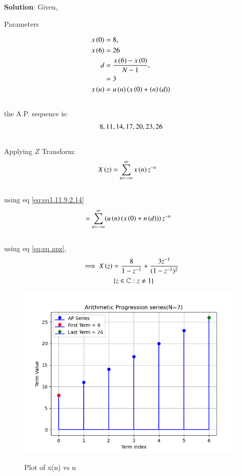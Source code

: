 \documentclass[journal,12pt,twocolumn]{IEEEtran}
\begin{document}
\noindent \textbf{Solution}:
\noindent
Given,
\begin{table}[h]
    \centering
    
    \caption{Parameters}
    \label{tab: 11.9.2.14.1}
\end{table}
\begin{align}
    x\brak{0}&=8,\\  %
    x\brak{6}&=26  \\  %
	d&=\frac{x\brak{6} - x\brak{0}}{N-1},\\
    &=3\\
	x\brak{n}&=u\brak{n}\brak{x\brak{0}+\brak{n}\brak{d}} \label{eq:eq1.11.9.2.14}
\end{align}\\	
the A.P. sequence is:\\
\begin{align}
\notag 8,11,14,17,20,23,26
\end{align}\\
Applying $Z$ Transform:     
\begin{align}
    X\left(z\right)&=\sum_{n=-\infty}^{\infty} x \left(n\right)z^{-n} 
\end{align}\\
using eq \eqref{eq:eq1.11.9.2.14}
\begin{align}
	&=\sum_{n=-\infty}^{\infty}(u\left(n\right)\left(x\left(0\right)+n\left(d\right))\right)z^{-n}
 \end{align}\\
using eq \eqref{eq:eq apz},
\begin{align}
    \implies X\left(z\right)&=\frac{8}{1-z^{-1}} + \frac{3 z^{-1}}{(1-z^{-1})^2}\\
    \notag &\left\{z\in\mathbb{C} : z \neq 1\right\}
\end{align}
\begin{figure}[ht]
\centering
   \includegraphics[width=1\linewidth]{figs/plot1.png}
   \caption{Plot of x(n) vs n}
   \hfill\label{fig: 11.9.2.14}
\end{figure}
\end{document}
